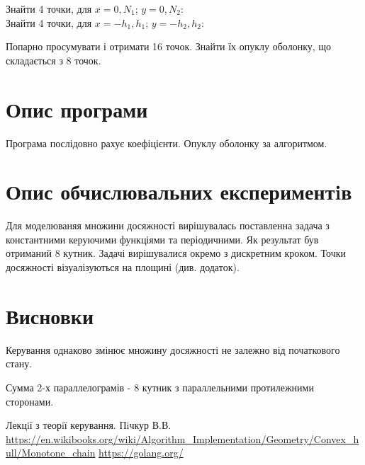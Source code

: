 \documentclass[fontsize=14pt,DIV=1,a4paper]{scrartcl}
\begin{document}
Знайти 4 точки, для $x=0,N_1$; $y=0,N_2$:
\begin{equation}
[A_{1,1}\cdot x+A_{1,2}\cdot y,A_{2,1}\cdot x+A_{2,2}\cdot y]
\end{equation}
Знайти 4 точки, для $x=-h_1,h_1$; $y=-h_2,h_2$:
\begin{equation}
[B_{1,1}\cdot x+B_{1,2}\cdot y,B_{2,1}\cdot x+B_{2,2}\cdot y]
\end{equation}

Попарно просумувати і отримати 16 точок.
Знайти їх опуклу оболонку, що складається з 8 точок.

\section{Опис програми}

Програма послідовно рахує коефіцієнти. Опуклу оболонку за алгоритмом.

\section{Опис обчислювальних експериментiв}

Для моделюваняя множини досяжності вирішувалась поставленна задача з константними керуючими функціями та періодичними. Як результат був отриманий 8 кутник. Задачі вирішувалися окремо з дискретним кроком. Точки досяжності візуалізуються на площині (див. додаток).

\section{Висновки}

Керування однаково змінює множину досяжності не залежно від початкового стану.

Сумма 2-х параллелограмів - 8 кутник з параллельними протилежними сторонами.
	
	\newpage
	\begin{thebibliography}{9}
		Лекцiї з теорiї керування. Пiчкур В.В.
		\url{https://en.wikibooks.org/wiki/Algorithm_Implementation/Geometry/Convex_hull/Monotone_chain}
		\url{https://golang.org/}
	\end{thebibliography}
\end{document}
